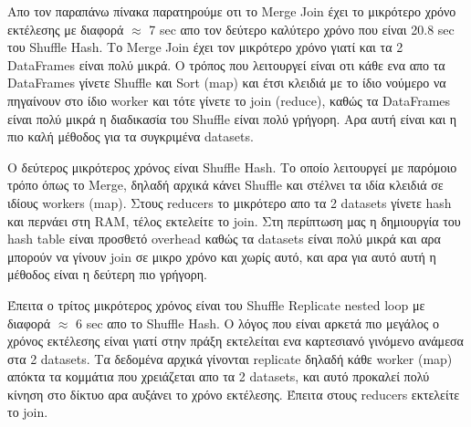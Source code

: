 \documentclass[12pt, a4paper]{article}
\begin{document}
\begin{table}[h]
\centering
{}
\caption{Σύγκριση διαφορετικών στρατηγικών join για το Query 3.}
\label{z5_results_q3}
\end{table}

Απο τον παραπάνω πίνακα παρατηρούμε οτι το Merge Join έχει το μικρότερο χρόνο εκτέλεσης με διαφορά
$\approx$ 7 sec απο τον δεύτερο καλύτερο χρόνο που είναι 20.8 sec του Shuffle Hash. Το Merge Join έχει
τον μικρότερο χρόνο γιατί και τα 2 DataFrames είναι πολύ μικρά. Ο τρόπος που λειτουργεί είναι οτι κάθε
ενα απο τα DataFrames γίνετε Shuffle και Sort (map) και έτσι κλειδιά με το ίδιο νούμερο
να πηγαίνουν στο ίδιο worker και τότε γίνετε το join (reduce), καθώς τα DataFrames είναι πολύ 
μικρά η διαδικασία του Shuffle είναι πολύ γρήγορη. Αρα αυτή είναι και η πιο καλή μέθοδος για 
τα συγκριμένα datasets.

Ο δεύτερος μικρότερος χρόνος είναι Shuffle Hash. Το οποίο λειτουργεί με παρόμοιο τρόπο όπως το Merge,
δηλαδή αρχικά κάνει Shuffle και στέλνει τα ιδία κλειδιά σε ιδίους workers (map). Στους reducers 
το μικρότερο απο τα 2 datasets γίνετε hash και περνάει στη RAM, τέλος εκτελείτε το join. Στη
περίπτωση μας η δημιουργία του hash table είναι προσθετό overhead καθώς τα datasets είναι πολύ
μικρά και αρα μπορούν να γίνουν join σε μικρο χρόνο και χωρίς αυτό, και αρα για αυτό αυτή η μέθοδος
είναι η δεύτερη πιο γρήγορη.

Έπειτα ο τρίτος μικρότερος χρόνος είναι του Shuffle Replicate nested loop με διαφορά $\approx$ 6 sec απο
το Shuffle Hash. Ο λόγος που είναι αρκετά πιο μεγάλος ο χρόνος εκτέλεσης είναι γιατί στην πράξη
εκτελείται ενα καρτεσιανό γινόμενο ανάμεσα στα 2 datasets. Τα δεδομένα αρχικά γίνονται 
replicate δηλαδή κάθε worker (map) απόκτα τα κομμάτια που χρειάζεται απο τα 2 datasets, 
και αυτό προκαλεί πολύ κίνηση στο δίκτυο αρα αυξάνει το χρόνο εκτέλεσης. Έπειτα στους 
reducers εκτελείτε το join.
\end{document}
